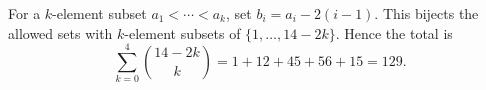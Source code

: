 For a $k$-element subset $a_1<\cdots<a_k$, set $b_i=a_i-2(i-1)$. This bijects the allowed sets with $k$-element subsets of $\{1,\ldots,14-2k\}$. Hence the total is
\[
\sum_{k=0}^4\binom{14-2k}{k}=1+12+45+56+15=\boxed{129}.
\]
